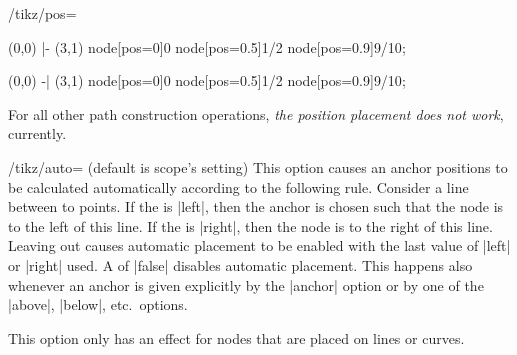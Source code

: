 \begin{key}{/tikz/pos=}
\begin{codeexample}[]
\tikz \draw (0,0) |- (3,1)
  node[pos=0]{0} node[pos=0.5]{1/2} node[pos=0.9]{9/10};
\end{codeexample}

\begin{codeexample}[]
\tikz \draw (0,0) -| (3,1)
  node[pos=0]{0} node[pos=0.5]{1/2} node[pos=0.9]{9/10};
\end{codeexample}

  For all other path construction operations, \emph{the position
  placement does not work}, currently.
\end{key}

\begin{key}{/tikz/auto= (default \normalfont is scope's setting)}
  This option causes an anchor positions to be calculated
  automatically according to the following rule. Consider a line
  between to points. If the  is |left|, then the
  anchor is chosen such that the node is to the left of this line. If
  the  is |right|, then the node is to the right of
  this line. Leaving out  causes automatic placement
  to be enabled with the last value of |left| or |right| used. A
   of |false| disables automatic placement. This
  happens also  whenever an anchor is given explicitly by the
  |anchor| option or by one of the |above|, |below|, etc.\ options.

  This option only has an effect for nodes that are placed on lines or
  curves.

\begin{codeexample}[]
\end{codeexample}
\end{key}

